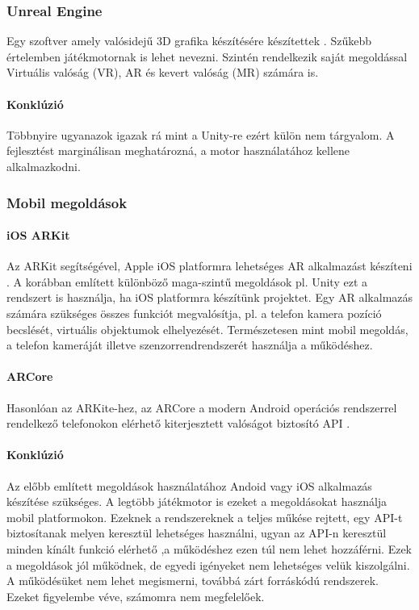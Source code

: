\documentclass[12pt,a4paper,oneside]{report} %
\begin{document}
\subsubsection{Unreal Engine}
Egy szoftver amely valósidejű 3D grafika készítésére készítettek \cite{unrealengine}. Szűkebb értelemben játékmotornak is lehet  nevezni. Szintén rendelkezik saját megoldással Virtuális valóság (VR), AR és kevert valóság (MR) számára is.
\paragraph{Konklúzió} Többnyire ugyanazok igazak rá mint a Unity-re ezért külön nem tárgyalom. A fejlesztést marginálisan meghatározná, a motor használatához kellene alkalmazkodni.
\subsubsection{Mobil megoldások}
\paragraph{iOS ARKit}
Az ARKit segítségével, Apple iOS platformra lehetséges AR alkalmazást készíteni \cite{arkit}. A korábban említett különböző maga-szintű megoldások pl. Unity ezt a rendszert is használja, ha iOS platformra készítünk projektet. Egy AR alkalmazás számára szükséges összes funkciót megvalósítja, pl. a telefon kamera pozíció becslését, virtuális objektumok elhelyezését. Természetesen mint mobil megoldás, a telefon kameráját illetve szenzorrendrendszerét használja a működéshez.
\paragraph{ARCore}
Hasonlóan az ARKite-hez, az ARCore a modern Android operációs rendszerrel rendelkező telefonokon elérhető kiterjesztett valóságot biztosító API \cite{arcore}.
\paragraph{Konklúzió}
Az előbb említett megoldások használatához Andoid vagy iOS alkalmazás készítése szükséges. A legtöbb játékmotor is ezeket a megoldásokat használja mobil platformokon. Ezeknek a rendszereknek a teljes műkése rejtett, egy API-t biztosítanak melyen keresztül lehetséges használni, ugyan az API-n keresztül minden kínált funkció elérhető ,a működéshez ezen túl nem lehet hozzáférni. Ezek a megoldások jól működnek, de egyedi igényeket nem lehetséges velük kiszolgálni. A működésüket nem lehet megismerni, továbbá zárt forráskódú rendszerek. Ezeket figyelembe véve, számomra nem megfelelőek.
\end{document}
